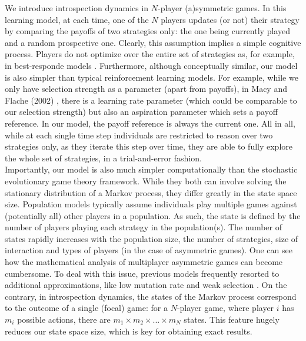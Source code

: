 \documentclass[11pt]{article}
\theoremstyle{plainCl1}
\theoremstyle{plainCl2}
\begin{document}
We introduce introspection dynamics in $N$-player (a)symmetric games. In this learning model, at each time, one of the $N$ players updates (or not) their strategy by comparing the payoffs of two strategies only: the one being currently played and a random prospective one. Clearly, this assumption implies a simple cognitive process. Players do not optimize over the entire set of strategies as, for example, in best-responde models \cite{Gaunersdorfer:GEB:1995, Hofbauer:GEB:2005}. Furthermore, although conceptually similar, our model is also simpler than typical reinforcement learning models. For example, while we only have selection strength as a parameter (apart from payoffs), in Macy and Flache (2002) \cite{Macy:PNAS:2002}, there is a learning rate parameter (which could be comparable to our selection strength) but also an aspiration parameter which sets a payoff reference. In our model, the payoff reference is always the current one. All in all, while at each single time step individuals are restricted to reason over two strategies only, as they iterate this step over time, they are able to fully explore the whole set of strategies, in a trial-and-error fashion. \\

\noindent Importantly, our model is also much simpler computationally than the stochastic evolutionary game theory framework. While they both can involve solving the stationary distribution of a Markov process, they differ greatly in the state space size. Population models typically assume individuals play multiple games against (potentially all) other players in a population. As such, the state is defined by the number of players playing each strategy in the population(s). The number of states rapidly increases with the population size, the number of strategies, size of interaction and types of players (in the case of asymmetric games). One can see how the mathematical analysis of multiplayer asymmetric games can become cumbersome. To deal with this issue, previous models frequently resorted to additional approximations, like low mutation rate \cite{Fudenberg:JET:2006, Veller:JET:2016} and weak selection \cite{Wild:JTB:2007}. %
On the contrary, in introspection dynamics, the states of the Markov process correspond to the outcome of a single (focal) game: for a $N$-player game, where player $i$ has $m_i$ possible actions, there are $m_1 \times m_2 \times ... \times m_N$ states. This feature hugely reduces our state space size, which is key for obtaining exact results.  \\
\end{document}
